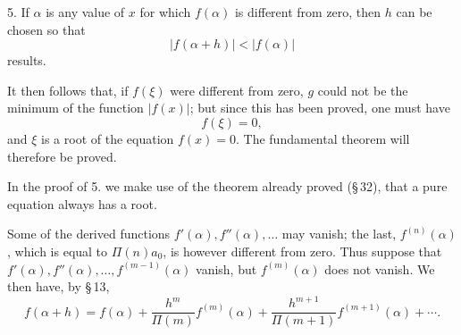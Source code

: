 \documentclass[11pt]{article}
\begin{document}
5. If $\alpha$ is any value of $x$ for which $f(\alpha)$ is different from zero, then $h$ can be chosen so that
\begin{equation}
 |f(\alpha+h)|<|f(\alpha)|
\tag{10}
\end{equation}
results.

It then follows that, if $f(\xi)$ were different from zero, $g$ could not be the minimum of the function $|f(x)|$; but since this has been proved, one must have
\begin{equation}
 f(\xi)=0,
\tag{11}
\end{equation}
and $\xi$ is a root of the equation $f(x)=0$. The fundamental theorem will therefore be proved.

In the proof of 5. we make use of the theorem already proved (\S\,32), that a pure equation always has a root.

Some of the derived functions $f'(\alpha),f''(\alpha),\ldots$ may vanish; the last, $f^{(n)}(\alpha)$, which is equal to $\Pi(n)a_0$, is however different from zero. Thus suppose that $f'(\alpha),f''(\alpha),\ldots,f^{(m-1)}(\alpha)$ vanish, but $f^{(m)}(\alpha)$ does not vanish. We then have, by \S\,13,
\begin{equation}
 f(\alpha+h)=f(\alpha)+\frac{h^m}{\Pi(m)}f^{(m)}(\alpha)
 +\frac{h^{m+1}}{\Pi(m+1)}f^{(m+1)}(\alpha)+\cdots .
\tag{12}
\end{equation}
\end{document}
